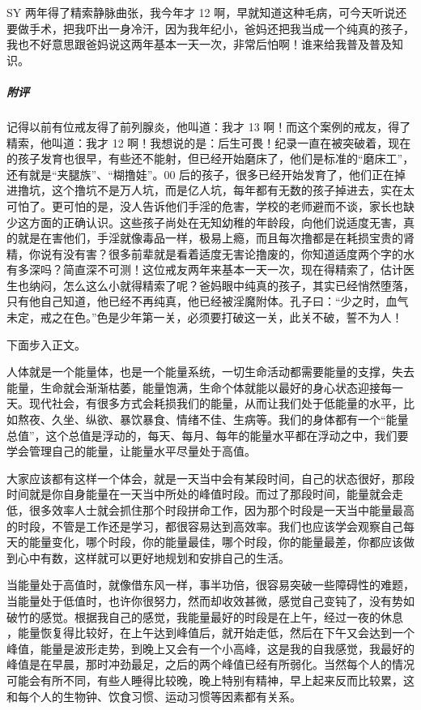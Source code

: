 \begin{case}
    SY 两年得了精索静脉曲张，我今年才 12 啊，早就知道这种毛病，可今天听说还要做手术，把我吓出一身冷汗，因为我年纪小，爸妈还把我当成一个纯真的孩子，我也不好意思跟爸妈说这两年基本一天一次，非常后怕啊！谁来给我普及普及知识。
    \subparagraph{附评} 记得以前有位戒友得了前列腺炎，他叫道：我才 13 啊！而这个案例的戒友，得了精索，他叫道：我才 12 啊！我想说的是：后生可畏！纪录一直在被突破着，现在的孩子发育也很早，有些还不能射，但已经开始磨床了，他们是标准的“磨床工”，还有就是“夹腿族”、“糊撸娃”。00 后的孩子，很多已经开始发育了，他们正在掉进撸坑，这个撸坑不是万人坑，而是亿人坑，每年都有无数的孩子掉进去，实在太可怕了。更可怕的是，没人告诉他们手淫的危害，学校的老师避而不谈，家长也缺少这方面的正确认识。这些孩子尚处在无知幼稚的年龄段，向他们说适度无害，真的就是在害他们，手淫就像毒品一样，极易上瘾，而且每次撸都是在耗损宝贵的肾精，你说有没有害？很多前辈就是看着适度无害论撸废的，你知道适度两个字的水有多深吗？简直深不可测！这位戒友两年来基本一天一次，现在得精索了，估计医生也纳闷，怎么这么小就得精索了呢？爸妈眼中纯真的孩子，其实已经悄然堕落，只有他自己知道，他已经不再纯真，他已经被淫魔附体。孔子曰：“少之时，血气未定，戒之在色。”色是少年第一关，必须要打破这一关，此关不破，誓不为人！
\end{case}

下面步入正文。

人体就是一个能量体，也是一个能量系统，一切生命活动都需要能量的支撑，失去能量，生命就会渐渐枯萎，能量饱满，生命个体就能以最好的身心状态迎接每一天。现代社会，有很多方式会耗损我们的能量，从而让我们处于低能量的水平，比如熬夜、久坐、纵欲、暴饮暴食、情绪不佳、生病等。我们的身体都有一个“能量总值”，这个总值是浮动的，每天、每月、每年的能量水平都在浮动之中，我们要学会管理自己的能量，让能量水平尽量处于高值。

大家应该都有这样一个体会，就是一天当中会有某段时间，自己的状态很好，那段时间就是你自身能量在一天当中所处的峰值时段。而过了那段时间，能量就会走低，很多效率人士就会抓住那个时段拼命工作，因为那个时段是一天当中能量最高的时段，不管是工作还是学习，都很容易达到高效率。我们也应该学会观察自己每天的能量变化，哪个时段，你的能量最佳，哪个时段，你的能量最差，你都应该做到心中有数，这样就可以更好地规划和安排自己的生活。

当能量处于高值时，就像借东风一样，事半功倍，很容易突破一些障碍性的难题，当能量处于低值时，也许你很努力，然而却收效甚微，感觉自己变钝了，没有势如破竹的感觉。根据我自己的感觉，我能量最好的时段是在上午，经过一夜的休息 ，能量恢复得比较好，在上午达到峰值后，就开始走低，然后在下午又会达到一个峰值，能量是波形走势，到晚上又会有一个小高峰，这是我的自我感觉，我最好的峰值是在早晨，那时冲劲最足，之后的两个峰值已经有所弱化。当然每个人的情况可能会有所不同，有些人睡得比较晚，晚上特别有精神，早上起来反而比较累，这和每个人的生物钟、饮食习惯、运动习惯等因素都有关系。

